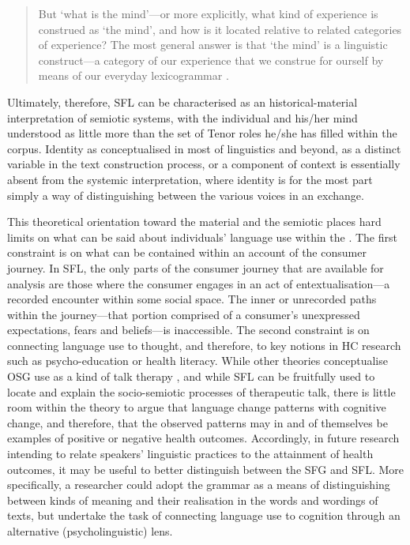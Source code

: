 \begin{quote}\singlespacing\small
But `what is the mind'---or more explicitly, what kind of experience is construed as `the mind', and how is it located relative to related categories of experience? The most general answer is that `the mind' is a linguistic construct---a category of our experience that we construe for ourself by means of our everyday \gls{lexicogrammar} \parencite*[p.~327]{matthiessen1998construing}.
\end{quote}
%
Ultimately, therefore, \gls{SFL} can be characterised as an historical\hyp{}material interpretation of semiotic systems, with the individual and his\slash her mind understood as little more than the set of Tenor roles he\slash she has filled within the \gls{corpus}. Identity as conceptualised in most of linguistics and beyond, as a distinct variable in the text construction process, or a component of context \cite[see][]{zimmerman1998identity} is essentially absent from the systemic interpretation, where identity is for the most part simply a way of distinguishing between the various voices in an exchange.

This theoretical orientation toward the material and the semiotic \cite{thompson2001interview} places hard limits on what can be said about individuals' language use within the . The first constraint is on what can be contained within an account of the consumer journey. In \gls{SFL}, the only parts of the \gls{consumer} journey that are available for analysis are those where the \gls{consumer} engages in an act of entextualisation---a recorded encounter within some social space. The inner or unrecorded paths within the journey---that portion comprised of a consumer's unexpressed expectations, fears and beliefs---is inaccessible. The second constraint is on connecting language use to thought, and therefore, to key notions in \gls{HC} research such as psycho\hyp{}education or health literacy. While other theories conceptualise \gls{OSG} use as a kind of talk therapy \cite{kaufman2016producing}, and while \gls{SFL} can be fruitfully used to locate and explain the socio\hyp{}semiotic processes of therapeutic talk, there is little room within the theory to argue that language change patterns with cognitive change, and therefore, that the observed patterns may in and of themselves be examples of positive or negative health outcomes. Accordingly, in future research intending to relate speakers' linguistic practices to the attainment of health outcomes, it may be useful to better distinguish between the \gls{SFG} and \gls{SFL}. More specifically, a researcher could adopt the grammar as a means of distinguishing between kinds of meaning and their realisation in the words and wordings of texts, but undertake the task of connecting language use to cognition through an alternative (psycholinguistic) lens.

